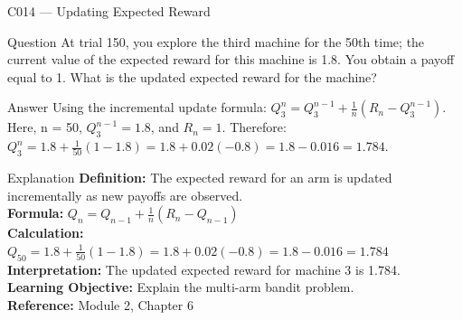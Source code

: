 \documentclass[aspectratio=169,8pt]{beamer}
\begin{document}
	\begin{frame}{C014 --- Updating Expected Reward}
		\begin{block}{Question}
			At trial 150, you explore the third machine for the 50th time; the current value of the expected reward for this machine is 1.8. You obtain a payoff equal to 1. What is the updated expected reward for the machine?
		\end{block}
		\begin{block}{Answer}
			Using the incremental update formula: $Q_3^n = Q_3^{n-1} + \frac{1}{n}(R_n - Q_3^{n-1})$. Here, n = 50, $Q_3^{n-1} = 1.8$, and $R_n = 1$. Therefore: $Q_3^n = 1.8 + \frac{1}{50}(1 - 1.8) = 1.8 + 0.02(-0.8) = 1.8 - 0.016 = 1.784$.
		\end{block}
		\begin{block}{Explanation}
			\textbf{Definition:} The expected reward for an arm is updated incrementally as new payoffs are observed.\\
			\textbf{Formula:} $Q_n = Q_{n-1} + \frac{1}{n}(R_n - Q_{n-1})$\\
			\textbf{Calculation:} $Q_{50} = 1.8 + \frac{1}{50}(1 - 1.8) = 1.8 + 0.02(-0.8) = 1.8 - 0.016 = 1.784$\\
			\textbf{Interpretation:} The updated expected reward for machine 3 is 1.784.\\
			\textbf{Learning Objective:} Explain the multi-arm bandit problem.\\
			\textbf{Reference:} Module 2, Chapter 6
		\end{block}
	\end{frame}
	
\end{document}
